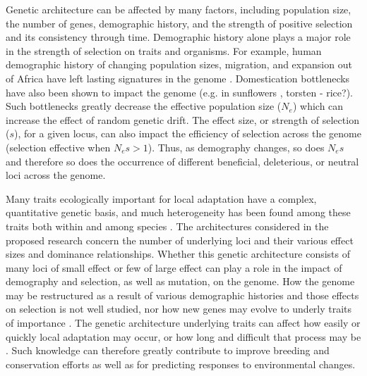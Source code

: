 Genetic architecture can be affected by many factors, including population size, the number of genes, demographic history, and the strength of positive selection and its consistency through time. Demographic history alone plays a major role in the strength of selection on traits and organisms. For example, human demographic history of changing population sizes, migration, and expansion out of Africa have left lasting signatures in the genome \citep{Fu:2014jt, Gravel:2011iq, Henn:2015dp}. Domestication bottlenecks have also been shown to impact the genome (e.g. in sunflowers \citep{Renaut:2015hi}, torsten - rice?). Such bottlenecks greatly decrease the effective population size ($N_e$) which can increase the effect of random genetic drift. The effect size, or strength of selection ($s$), for a given locus, can also impact the efficiency of selection across the genome (selection effective when $N_es>1$). Thus, as demography changes, so does $N_es$ and therefore so does the occurrence of different beneficial, deleterious, or neutral loci across the genome.

Many traits ecologically important for local adaptation have a complex, quantitative genetic basis, and much heterogeneity has been found among these traits both within and among species \citep{orr:2001, slate:2005}. The architectures considered in the proposed research concern the number of underlying loci and their various effect sizes and dominance relationships. Whether this genetic architecture consists of many loci of small effect or few of large effect can play a role in the impact of demography and selection, as well as mutation, on the genome. How the genome may be restructured as a result of various demographic histories and those effects on selection is not well studied, nor how new genes may evolve to underly traits of importance \citep{Long:2003}. The genetic architecture underlying traits can affect how easily or quickly local adaptation may occur, or how long and difficult that process may be \citep{Yeaman:2015cc, Yeaman:2011jv}. Such knowledge can therefore greatly contribute to improve breeding and conservation efforts as well as for predicting responses to environmental changes.

